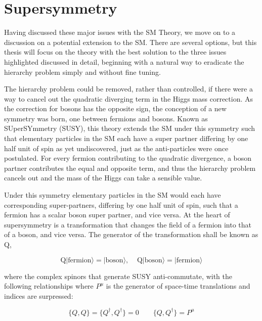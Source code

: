 \section{Supersymmetry}

Having discussed these major issues with the SM Theory, we move on to a discussion on a potential extension to the SM. There are several options, but this thesis will focus on the theory with the best solution to the three issues highlighted discussed in detail, beginning with a natural way to eradicate the hierarchy problem simply and without fine tuning.

The hierarchy problem could be removed, rather than controlled, if there were a way to cancel out the quadratic diverging term in the Higgs mass correction. As the correction for bosons has the opposite sign, the conception of a new symmetry was born, one between fermions and bosons. Known as SUperSYmmetry (SUSY), this theory extends the SM under this symmetry such that elementary particles in the SM each have a super partner differing by one half unit of spin as yet undiscovered, just as the anti-particles were once postulated. For every fermion contributing to the quadratic divergence, a boson partner contributes the equal and opposite term, and thus the hierarchy problem cancels out and the mass of the Higgs can take a sensible value.

Under this symmetry elementary particles in the SM would each have corresponding super-partners, differing by one half unit of spin, such that a fermion has a scalar boson super partner, and vice versa. At the heart of supersymmetry is a transformation that changes the field of a fermion into that of a boson, and vice versa. The generator of the transformation shall be known as Q,

\begin{equation}
\textrm{Q}|\textrm{fermion}\rangle = |\textrm{boson}\rangle,  \; \; \; \;  \textrm{Q}|\textrm{boson}\rangle = |\textrm{fermion}\rangle  
\label{eqn:Q}
\end{equation}

where the complex spinors that generate SUSY anti-commutate, with the following relationships where $P^{\mu}$ is the generator of space-time translations and indices are surpressed:


\begin{equation}
\{Q,Q\} = \{Q^{\dagger},Q^{\dagger}\} = 0 \qquad \{Q,Q^{\dagger}\} = P^{\mu} 
\end{equation} 



